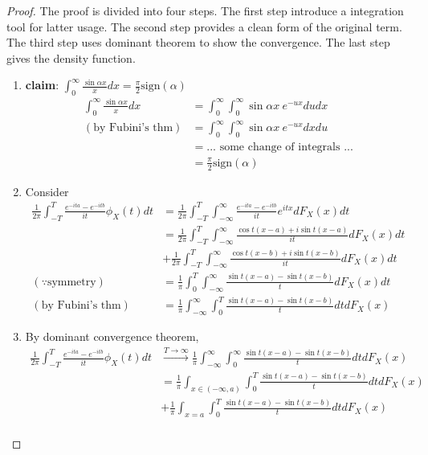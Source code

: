\documentclass[../Transformation.tex]{subfiles}
\begin{document}
\begin{proof}
	The proof is divided into four steps. The first step introduce a integration tool for latter usage. The second step provides a clean form of the original term. The third step uses dominant theorem to show the convergence. The last step gives the density function.
	\begin{enumerate}
		\item {\bf claim}: $\int_0^{\infty}\frac{\sin\alpha x}{x}dx = \frac{\pi}{2}\mbox{sign}(\alpha)$\\
		\begin{align*}
		\int_0^{\infty}\frac{\sin\alpha x}{x}dx &= \int_0^{\infty}\int_0^{\infty}\sin\alpha x\ e^{-ux}dudx\\
		(\mbox{by Fubini's thm})&=\int_0^{\infty}\int_0^{\infty}\sin\alpha x\ e^{-ux}dxdu\\
		&= ...\mbox{ some change of integrals }...\\
		&=\frac{\pi}{2}\mbox{sign}(\alpha)
		\end{align*}
		\item Consider
		\begin{align*}
		\frac{1}{2\pi}\int_{-T}^{T}\frac{e^{-ita}-e^{-itb}}{it}\phi_X(t)dt &= \frac{1}{2\pi}\int_{-T}^{T}\int_{-\infty}^{\infty}\frac{e^{-ita}-e^{-itb}}{it}e^{itx}dF_X(x)dt\\
		&=\frac{1}{2\pi}\int_{-T}^{T}\int_{-\infty}^{\infty}\frac{\cos t(x-a)+i\sin t(x-a)}{it}dF_X(x)dt\\
		&+\frac{1}{2\pi}\int_{-T}^{T}\int_{-\infty}^{\infty}\frac{\cos t(x-b)+i\sin t(x-b)}{it}dF_X(x)dt\\
		(\because\mbox{symmetry})&=\frac{1}{\pi}\int_0^{T}\int_{-\infty}^{\infty}\frac{\sin t(x-a) - \sin t(x-b)}{t}dF_X(x)dt\\
		(\mbox{by Fubini's thm})&=\frac{1}{\pi}\int_{-\infty}^{\infty}\int_0^{T}\frac{\sin t(x-a) - \sin t(x-b)}{t}dtdF_X(x)
		\end{align*}
		\item By dominant convergence theorem,
		\begin{align*}
		\frac{1}{2\pi}\int_{-T}^{T}\frac{e^{-ita}-e^{-itb}}{it}\phi_X(t)dt &\xrightarrow{T\rightarrow\infty}\frac{1}{\pi}\int_{-\infty}^{\infty}\int_0^{\infty}\frac{\sin t(x-a) - \sin t(x-b)}{t}dtdF_X(x)\\
		&=\frac{1}{\pi}\int_{x\in(-\infty,a)}\int_0^{T}\frac{\sin t(x-a) - \sin t(x-b)}{t}dtdF_X(x)\\
		&+\frac{1}{\pi}\int_{x=a}\int_0^{T}\frac{\sin t(x-a) - \sin t(x-b)}{t}dtdF_X(x)\\

\end{align*}
\end{enumerate}
\end{proof}
\end{document}
